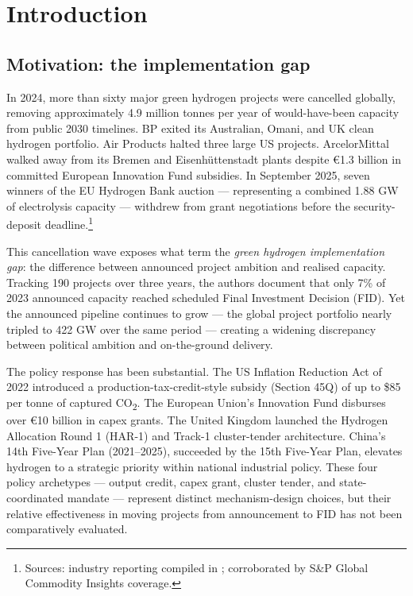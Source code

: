 \chapter{Introduction}
\label{ch:introduction}

\section{Motivation: the implementation gap}

In 2024, more than sixty major green hydrogen projects were cancelled globally, removing approximately 4.9 million tonnes per year of would-have-been capacity from public 2030 timelines. BP exited its Australian, Omani, and UK clean hydrogen portfolio. Air Products halted three large US projects. ArcelorMittal walked away from its Bremen and Eisenhüttenstadt plants despite \euro 1.3 billion in committed European Innovation Fund subsidies. In September 2025, seven winners of the EU Hydrogen Bank auction --- representing a combined 1.88 GW of electrolysis capacity --- withdrew from grant negotiations before the security-deposit deadline.\footnote{Sources: industry reporting compiled in \cite{decarbonizeweekly2026,ing2026,bucklebridge2026}; corroborated by S\&P Global Commodity Insights coverage.}

This cancellation wave exposes what \cite{odenweller2025green} term the \emph{green hydrogen implementation gap}: the difference between announced project ambition and realised capacity. Tracking 190 projects over three years, the authors document that only 7\% of 2023 announced capacity reached scheduled Final Investment Decision (FID). Yet the announced pipeline continues to grow --- the global project portfolio nearly tripled to 422 GW over the same period --- creating a widening discrepancy between political ambition and on-the-ground delivery.

The policy response has been substantial. The US Inflation Reduction Act of 2022 introduced a production-tax-credit-style subsidy (Section 45Q) of up to \$85 per tonne of captured CO\textsubscript{2}. The European Union's Innovation Fund disburses over \euro 10 billion in capex grants. The United Kingdom launched the Hydrogen Allocation Round 1 (HAR-1) and Track-1 cluster-tender architecture. China's 14th Five-Year Plan (2021--2025), succeeded by the 15th Five-Year Plan, elevates hydrogen to a strategic priority within national industrial policy. These four policy archetypes --- output credit, capex grant, cluster tender, and state-coordinated mandate --- represent distinct mechanism-design choices, but their relative effectiveness in moving projects from announcement to FID has not been comparatively evaluated.


